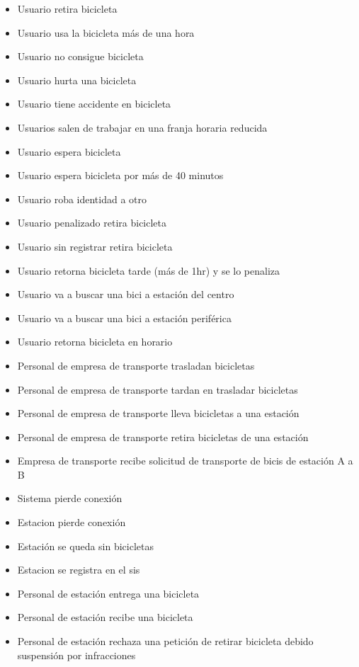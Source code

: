 \documentclass[a4paper, 10pt, twoside]{article}
\begin{document}
\begin{multicols}{2}
  \begin{itemize}
    \item Usuario retira bicicleta	
    \item Usuario usa la bicicleta más de una hora
    \item Usuario no consigue bicicleta
    \item Usuario hurta una bicicleta	
    \item Usuario tiene accidente en bicicleta
    \item Usuarios salen de trabajar en una franja horaria reducida	
    \item Usuario espera bicicleta
    \item Usuario espera bicicleta por más de 40 minutos 
    \item Usuario roba identidad a otro
    \item Usuario penalizado retira bicicleta	
    \item Usuario sin registrar retira bicicleta
    \item Usuario retorna bicicleta tarde (más de 1hr) y se lo penaliza
    \item Usuario va a buscar una bici a estación del centro
    \item Usuario va a buscar una bici a estación periférica
    \item Usuario retorna bicicleta en horario 
    \item Personal de empresa de transporte trasladan bicicletas
    \item Personal de empresa de transporte tardan en trasladar bicicletas
    \item Personal de empresa de transporte lleva bicicletas a una estación
    \item Personal de empresa de transporte retira bicicletas de una estación
    \item Empresa de transporte recibe solicitud de transporte de bicis de estación A a B 
    \item Sistema pierde conexión
    \item Estacion pierde conexión
    \item Estación se queda sin bicicletas
    \item Estacion se registra en el sis
    \item Personal de estación entrega una bicicleta 
    \item Personal de estación recibe una bicicleta
    \item Personal de estación rechaza una petición de retirar bicicleta debido suspensión por infracciones

\end{itemize}
\end{multicols}
\end{document}
